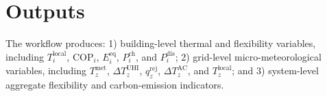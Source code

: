 \documentclass[conference]{IEEEtran}
\begin{document}
\section{Outputs}
The workflow produces: 1) building-level thermal and flexibility variables, including $T^{\mathrm{local}}_i$, $\mathrm{COP}_i$, $E^{\mathrm{eq}}_i$, $P^{\mathrm{ch}}_i$, and $P^{\mathrm{dis}}_i$; 2) grid-level micro-meteorological variables, including $T^{\mathrm{met}}_z$, $\Delta T^{\mathrm{UHI}}_z$, $q^{\mathrm{rej}}_z$, $\Delta T^{\mathrm{AC}}_z$, and $T^{\mathrm{local}}_z$; and 3) system-level aggregate flexibility and carbon-emission indicators.
\end{document}
